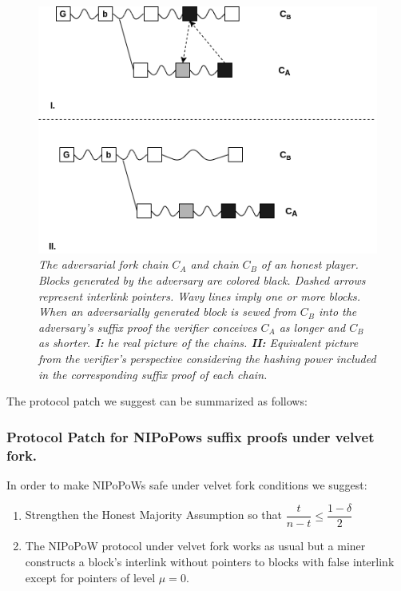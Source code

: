 \begin{figure}[h!]
	\begin{center}
		\includegraphics[scale=0.5]{figures/injection.png}
	\end{center}
	\caption{\textit{The adversarial fork chain $C_A$ and chain $C_B$ of an honest
	player. Blocks generated by the adversary are colored black. Dashed arrows
	represent interlink pointers. Wavy lines imply one or more blocks. When an
	adversarially generated block is sewed from $C_B$ into the adversary's suffix
	proof the verifier conceives $C_A$ as longer and $C_B$ as shorter.  \textbf{I:}
	he real picture of the chains. \textbf{II:} Equivalent picture from the verifier's
	perspective considering the hashing power included in the corresponding suffix
	proof of each chain.}}
	\label{fig:injection}
\end{figure}


The protocol patch we suggest can be summarized as follows:\\


\subsubsection*{Protocol Patch for NIPoPows suffix proofs under velvet fork.} In order
to make NIPoPoWs safe under velvet fork conditions we suggest:
\begin{enumerate}
\item Strengthen the Honest Majority Assumption so that $\dfrac{t}{n-t} \leq
\dfrac{1-\delta}{2}$
\item The NIPoPoW protocol under velvet fork works as usual but a miner constructs
a block's interlink without pointers to blocks with false interlink except for
pointers of level $\mu = 0$.
\end{enumerate}

